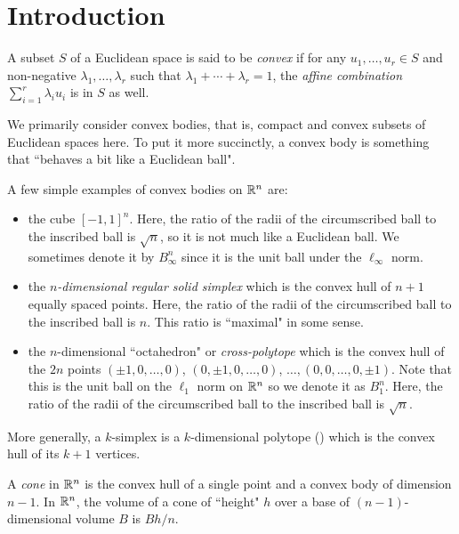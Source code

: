 \section{Introduction}

\begin{fdef}
A subset $S$ of a Euclidean space is said to be \textit{convex} if for any $u_1,\ldots,u_r\in S$ and non-negative $\lambda_1,\ldots,\lambda_r$ such that $\lambda_1+\cdots+\lambda_r=1$, the \textit{affine combination} $\sum_{i=1}^r \lambda_i u_i$ is in $S$ as well.
\end{fdef}

We primarily consider convex bodies, that is, compact and convex subsets of Euclidean spaces here. To put it more succinctly, a convex body is something that ``behaves a bit like a Euclidean ball".

A few simple examples of convex bodies on $\mathbb{R}^n$ are:
\begin{itemize}
    \item the cube $[-1,1]^n$. Here, the ratio of the radii of the circumscribed ball to the inscribed ball is $\sqrt n$, so it is not much like a Euclidean ball. We sometimes denote it by $B_\infty^n$ since it is the unit ball under the $\ell_\infty$ norm.
    \item the \textit{$n$-dimensional regular solid simplex} which is the convex hull of $n+1$ equally spaced points. Here, the ratio of the radii of the circumscribed ball to the inscribed ball is $n$. This ratio is ``maximal" in some sense.
    \item the $n$-dimensional ``octahedron" or \textit{cross-polytope} which is the convex hull of the $2n$ points $(\pm 1, 0,\ldots, 0)$, $(0,\pm 1, 0,\ldots, 0)$, $\ldots, (0,0,\ldots,0,\pm 1)$. Note that this is the unit ball on the $\ell_1$ norm on $\mathbb{R}^n$ so we denote it as $B_1^n$. Here, the ratio of the radii of the circumscribed ball to the inscribed ball is $\sqrt n$.
\end{itemize}

More generally, a $k$-simplex is a $k$-dimensional polytope () which is the convex hull of its $k+1$ vertices. 

\begin{definition}
A \textit{cone} in $\mathbb{R}^n$ is the convex hull of a single point and a convex body of dimension $n-1$. In $\mathbb{R}^n$, the volume of a cone of ``height" $h$ over a base of $(n-1)$-dimensional volume $B$ is $Bh/n$.
\end{definition}

